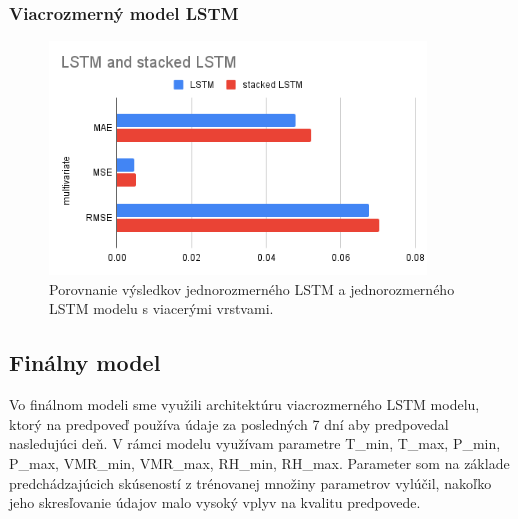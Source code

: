 \subsubsection{Viacrozmerný model LSTM}
\begin{figure}[!htbp]
  \centering
  \includegraphics[width=10cm]{img/LSTM and stacked LSTM.png}
  \caption{Porovnanie výsledkov jednorozmerného LSTM a jednorozmerného LSTM modelu s viacerými vrstvami.}
  \label{stackedlstm}
\end{figure}


\newpage
\subsection{Finálny model}
Vo finálnom modeli sme využili architektúru viacrozmerného LSTM modelu, ktorý na predpoveď používa údaje za posledných 7 dní aby predpovedal nasledujúci deň. V rámci modelu využívam parametre T\_min, T\_max, P\_min, P\_max, VMR\_min, VMR\_max, RH\_min, RH\_max. Parameter som na základe predchádzajúcich skúseností z trénovanej množiny parametrov vylúčil, nakoľko jeho skresľovanie údajov malo vysoký vplyv na kvalitu predpovede.

